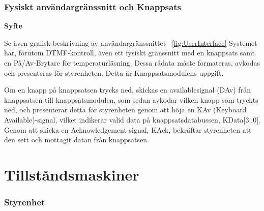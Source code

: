 \documentclass[a4paper,11pt]{article}
\begin{document}
		\subsubsection{Fysiskt användargränssnitt och Knappsats}

{\noindent \bf Syfte}

Se även grafisk beskrivning av användargränssnittet ~\ref{fig:UserInterface}
Systemet har, förutom DTMF-kontroll, även ett fysiskt gränssnitt med en knappsats samt en På/Av-Brytare för temperaturläsning.
Dessa rådata måste formateras, avkodas och presenteras för styrenheten. Detta är Knappsatsmodulens uppgift.

Om en knapp på knappsatsen trycks ned, skickas en availablesignal (DAv) från knappsatsen till knappsatsmodulen, som sedan
avkodar vilken knapp som tryckts ned, och presenterar detta för styrenheten genom att höja en KAv (Keyboard Available)-signal,
vilket indikerar valid data på knappsatsdatabussen, KData[3..0]. Genom att skicka en Acknowledgement-signal, KAck, bekräftar 
styrenheten att den sett och mottagit datan från knappsatsen.


\section{Tillståndsmaskiner}
		\subsubsection{Styrenhet}
\end{document}
